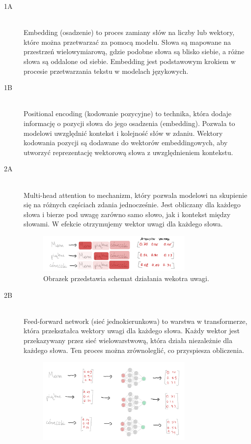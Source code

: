 \documentclass{article}
\begin{document}
    \begin{description}
      \item[1A] \hfill \\
      Embedding (osadzenie) to proces zamiany słów na liczby lub wektory, które można przetwarzać za pomocą modelu. Słowa są mapowane na przestrzeń wielowymiarową, gdzie podobne słowa są blisko siebie, a różne słowa są oddalone od siebie. Embedding jest podstawowym krokiem w procesie przetwarzania tekstu w modelach językowych.
      \item[1B ] \hfill \\
      Positional encoding (kodowanie pozycyjne) to technika, która dodaje informację o pozycji słowa do jego osadzenia (embedding). Pozwala to modelowi uwzględnić kontekst i kolejność słów w zdaniu. Wektory kodowania pozycji są dodawane do wektorów embeddingowych, aby utworzyć reprezentację wektorową słowa z uwzględnieniem kontekstu.
      \item[2A ] \hfill \\
      Multi-head attention to mechanizm, który pozwala modelowi na skupienie się na różnych częściach zdania jednocześnie. Jest obliczany dla każdego słowa i bierze pod uwagę zarówno samo słowo, jak i kontekst między słowami. W efekcie otrzymujemy wektor uwagi dla każdego słowa.
      \begin{figure}[h]
        \centering
        \includegraphics[width=0.75\textwidth]{images/wektor-uwagi.png}
        \caption{Obrazek przedstawia schemat działania wekotra uwagi.}
        \label{fig:mesh1}
    \end{figure}
      \item[2B  ] \hfill \\
      Feed-forward network (sieć jednokierunkowa) to warstwa w transformerze, która przekształca wektory uwagi dla każdego słowa. Każdy wektor jest przekazywany przez sieć wielowarstwową, która działa niezależnie dla każdego słowa. Ten proces można zrównoleglić, co przyspiesza obliczenia.
      \begin{figure}[h]
        \centering
        \includegraphics[width=0.75\textwidth]{images/siec-wielowarstowa.png}

\end{figure}
\end{description}
\end{document}
